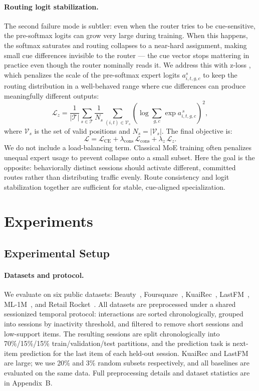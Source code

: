 \documentclass[sigconf,review,anonymous]{acmart}
\begin{document}
\paragraph{Routing logit stabilization.}
The second failure mode is subtler: even when the router tries to be cue-sensitive, the pre-softmax logits can grow very large during training. When this happens, the softmax saturates and routing collapses to a near-hard assignment, making small cue differences invisible to the router --- the cue vector stops mattering in practice even though the router nominally reads it. We address this with z-loss \cite{zoph2022stmoe}, which penalizes the scale of the pre-softmax expert logits $a_{i,t,g,c}^{s}$ to keep the routing distribution in a well-behaved range where cue differences can produce meaningfully different outputs:
\[
\mathcal{L}_{z}
=
\frac{1}{|\mathcal{T}|}
\sum_{s \in \mathcal{T}}
\frac{1}{N_s}
\sum_{(i,t)\in\mathcal{V}_s}
\!\left(\log \sum_{g,c}\exp a_{i,t,g,c}^{\,s}\right)^{\!2},
\]
where $\mathcal{V}_s$ is the set of valid positions and $N_s=|\mathcal{V}_s|$. The final objective is:
\[
\mathcal{L} = \mathcal{L}_{\mathrm{CE}} + \lambda_{\mathrm{cons}}\,\mathcal{L}_{\mathrm{cons}} + \lambda_{z}\,\mathcal{L}_{z}.
\]
We do not include a load-balancing term. Classical MoE training often penalizes unequal expert usage to prevent collapse onto a small subset. Here the goal is the opposite: behaviorally distinct sessions should activate different, committed routes rather than distributing traffic evenly. Route consistency and logit stabilization together are sufficient for stable, cue-aligned specialization.

\section{Experiments}
\label{sec:experiments}

\subsection{Experimental Setup}

\paragraph{Datasets and protocol.}
We evaluate on six public datasets: Beauty~\cite{mcauley2015amazon}, Foursquare~\cite{yang2015foursquare}, KuaiRec~\cite{gao2022kuairec}, LastFM~\cite{celma2010music}, ML-1M~\cite{harper2015movielens}, and Retail Rocket~\cite{retailrocket2015dataset}. All datasets are preprocessed under a shared sessionized temporal protocol: interactions are sorted chronologically, grouped into sessions by inactivity threshold, and filtered to remove short sessions and low-support items. The resulting sessions are split chronologically into 70\%/15\%/15\% train/validation/test partitions, and the prediction task is next-item prediction for the last item of each held-out session. KuaiRec and LastFM are large; we use 20\% and 3\% random subsets respectively, and all baselines are evaluated on the same data. Full preprocessing details and dataset statistics are in Appendix~B.
\end{document}
